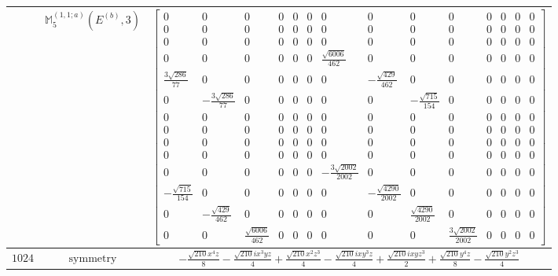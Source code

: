 \documentclass[fleqn,8pt,landscape]{jsarticle}
\begin{document}
\begin{longtable}{ccc}
$  $ & $ \mathbb{M}_{5}^{(1,1;a)}(E^{(b)},3) $ & $ \begin{bmatrix} 0 & 0 & 0 & 0 & 0 & 0 & 0 & 0 & 0 & 0 & 0 & 0 & 0 & 0 \\ 0 & 0 & 0 & 0 & 0 & 0 & 0 & 0 & 0 & 0 & 0 & 0 & 0 & 0 \\ 0 & 0 & 0 & 0 & 0 & 0 & 0 & 0 & 0 & 0 & 0 & 0 & 0 & 0 \\ 0 & 0 & 0 & 0 & 0 & 0 & \frac{\sqrt{6006}}{462} & 0 & 0 & 0 & 0 & 0 & 0 & 0 \\ \frac{3 \sqrt{286}}{77} & 0 & 0 & 0 & 0 & 0 & 0 & - \frac{\sqrt{429}}{462} & 0 & 0 & 0 & 0 & 0 & 0 \\ 0 & - \frac{3 \sqrt{286}}{77} & 0 & 0 & 0 & 0 & 0 & 0 & - \frac{\sqrt{715}}{154} & 0 & 0 & 0 & 0 & 0 \\ 0 & 0 & 0 & 0 & 0 & 0 & 0 & 0 & 0 & 0 & 0 & 0 & 0 & 0 \\ 0 & 0 & 0 & 0 & 0 & 0 & 0 & 0 & 0 & 0 & 0 & 0 & 0 & 0 \\ 0 & 0 & 0 & 0 & 0 & 0 & 0 & 0 & 0 & 0 & 0 & 0 & 0 & 0 \\ 0 & 0 & 0 & 0 & 0 & 0 & 0 & 0 & 0 & 0 & 0 & 0 & 0 & 0 \\ 0 & 0 & 0 & 0 & 0 & 0 & - \frac{3 \sqrt{2002}}{2002} & 0 & 0 & 0 & 0 & 0 & 0 & 0 \\ - \frac{\sqrt{715}}{154} & 0 & 0 & 0 & 0 & 0 & 0 & - \frac{\sqrt{4290}}{2002} & 0 & 0 & 0 & 0 & 0 & 0 \\ 0 & - \frac{\sqrt{429}}{462} & 0 & 0 & 0 & 0 & 0 & 0 & \frac{\sqrt{4290}}{2002} & 0 & 0 & 0 & 0 & 0 \\ 0 & 0 & \frac{\sqrt{6006}}{462} & 0 & 0 & 0 & 0 & 0 & 0 & \frac{3 \sqrt{2002}}{2002} & 0 & 0 & 0 & 0 \end{bmatrix} $ \\ \hline
$ 1024 $ & $ \text{symmetry} $ & $ - \frac{\sqrt{210} x^{4} z}{8} - \frac{\sqrt{210} i x^{3} y z}{4} + \frac{\sqrt{210} x^{2} z^{3}}{4} - \frac{\sqrt{210} i x y^{3} z}{4} + \frac{\sqrt{210} i x y z^{3}}{2} + \frac{\sqrt{210} y^{4} z}{8} - \frac{\sqrt{210} y^{2} z^{3}}{4} $ \\

\end{longtable}
\end{document}
